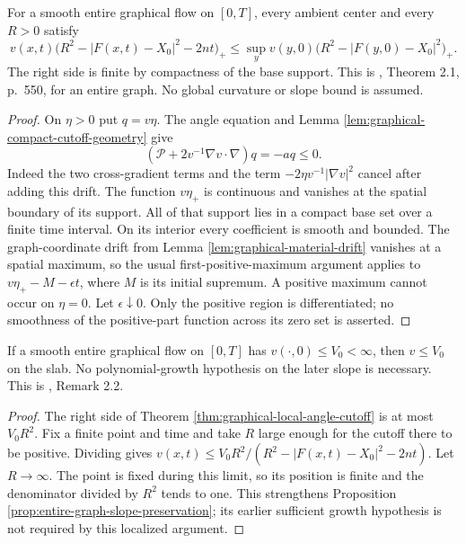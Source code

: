 \begin{theorem}\label{thm:graphical-local-angle-cutoff}
For a smooth entire graphical flow on $[0,T]$, every ambient center and every $R>0$ satisfy
\[
 v(x,t)\bigl(R^2-|F(x,t)-X_0|^2-2nt\bigr)_+
 \leq\sup_y v(y,0)\bigl(R^2-|F(y,0)-X_0|^2\bigr)_+.
\]
The right side is finite by compactness of the base support. This is \cite{EH91}, Theorem 2.1, p.~550, for an entire graph. No global curvature or slope bound is assumed.
\end{theorem}
\begin{proof}
On $\eta>0$ put $q=v\eta$. The angle equation and Lemma \ref{lem:graphical-compact-cutoff-geometry} give
\[
 \left(\mathcal P+2v^{-1}\nabla v\cdot\nabla\right)q=-a q\leq0.
\]
Indeed the two cross-gradient terms and the term $-2\eta v^{-1}|\nabla v|^2$ cancel after adding this drift. The function $v\eta_+$ is continuous and vanishes at the spatial boundary of its support. All of that support lies in a compact base set over a finite time interval. On its interior every coefficient is smooth and bounded. The graph-coordinate drift from Lemma \ref{lem:graphical-material-drift} vanishes at a spatial maximum, so the usual first-positive-maximum argument applies to $v\eta_+-M-\epsilon t$, where $M$ is its initial supremum. A positive maximum cannot occur on $\eta=0$. Let $\epsilon\downarrow0$. Only the positive region is differentiated; no smoothness of the positive-part function across its zero set is asserted.
\end{proof}

\begin{corollary}\label{cor:entire-slope-without-growth}
If a smooth entire graphical flow on $[0,T]$ has $v(\cdot,0)\leq V_0<\infty$, then $v\leq V_0$ on the slab. No polynomial-growth hypothesis on the later slope is necessary. This is \cite{EH91}, Remark 2.2.
\end{corollary}
\begin{proof}
The right side of Theorem \ref{thm:graphical-local-angle-cutoff} is at most $V_0R^2$. Fix a finite point and time and take $R$ large enough for the cutoff there to be positive. Dividing gives
$v(x,t)\leq V_0R^2/(R^2-|F(x,t)-X_0|^2-2nt)$. Let $R\to\infty$. The point is fixed during this limit, so its position is finite and the denominator divided by $R^2$ tends to one. This strengthens Proposition \ref{prop:entire-graph-slope-preservation}; its earlier sufficient growth hypothesis is not required by this localized argument.
\end{proof}

